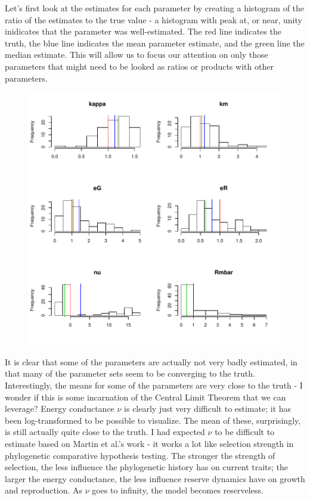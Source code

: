 \documentclass[12pt,reqno,final]{amsart}
\theoremstyle{plain}
\numberwithin{equation}{part}
\begin{document}
Let's first look at the estimates for each parameter by creating a
histogram of the ratio of the estimates to the true value - a
histogram with peak at, or near, unity inidicates that the parameter
was well-estimated. The red line indicates the truth, the blue line
indicates the mean parameter estimate, and the green line the median
estimate. This will allow us to focus our attention on only those
parameters that might need to be looked as ratios or products with
other parameters.
\begin{figure}
\includegraphics{Solving_the_problem_of_parameter_covariation-004}
\end{figure}

It is clear that some of the parameters are actually not very badly
estimated, in that many of the parameter sets seem to be converging to
the truth. Interestingly, the means for some of the parameters are
very close to the truth - I wonder if this is some incarnation of the
Central Limit Theorem that we can leverage? Energy conductance $\nu$ is
clearly just very difficult to estimate; it has been log-transformed
to be possible to visualize. The mean of these, surprisingly, is still
actually quite close to the truth. I had expected $\nu$ to be
difficult to estimate based on Martin et al.'s work - it works a lot
like selection strength in phylogenetic comparative hypothesis
testing. The stronger the strength of selection, the less influence
the phylogenetic history has on current traits; the larger the energy
conductance, the less influence reserve dynamics have on growth and
reproduction. As $\nu$ goes to infinity, the model becomes
reserveless.
\end{document}

